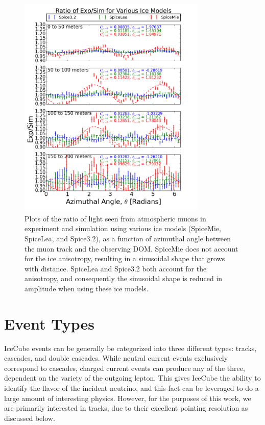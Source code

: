 \begin{figure}[h]
\centering
\includegraphics[width=0.8\textwidth]{figs/fourierfits.png}
\caption{Plots of the ratio of light seen from atmospheric muons in experiment and simulation using various ice models (SpiceMie, SpiceLea, and Spice3.2), as a function of azimuthal angle between the muon track and the observing DOM. SpiceMie does not account for the ice anisotropy, resulting in a sinusoidal shape that grows with distance. SpiceLea and Spice3.2 both account for the anisotropy, and consequently the sinusoidal shape is reduced in amplitude when using these ice models.}
\label{fig:anisotropyplot}
\end{figure}

\section{Event Types}
IceCube events can be generally be categorized into three different types: tracks, cascades, and double cascades. While neutral current events exclusively correspond to cascades, charged current events can produce any of the three, dependent on the variety of the outgoing lepton. This gives IceCube the ability to identify the flavor of the incident neutrino, and this fact can be leveraged to do a large amount of interesting physics. However, for the purposes of this work, we are primarily interested in tracks, due to their excellent pointing resolution as discussed below. 

